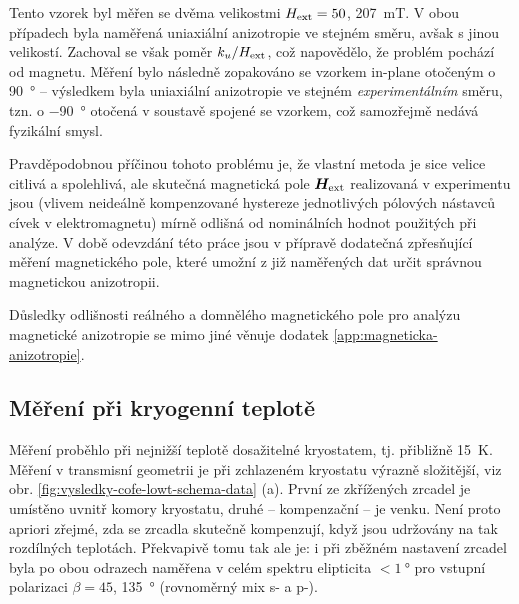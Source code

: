 Tento vzorek byl měřen se dvěma velikostmi $H_\textrm{ext} = 50$, \SI{207}{\milli\tesla}.
V obou případech byla naměřená uniaxiální anizotropie ve stejném směru, avšak s jinou velikostí.
Zachoval se však poměr $k_u/H_\textrm{ext}$, což napovědělo, že problém pochází od magnetu.
Měření bylo následně zopakováno se vzorkem in-plane otočeným o \SI{90}{\degree} -- výsledkem byla uniaxiální anizotropie ve stejném \emph{experimentálním} směru, tzn. o \SI{-90}{\degree} otočená v soustavě spojené se vzorkem, což samozřejmě nedává fyzikální smysl.

Pravděpodobnou příčinou tohoto problému je, že vlastní metoda je sice velice citlivá a spolehlivá, ale skutečná magnetická pole $\bm{H}_\textrm{ext}$ realizovaná v experimentu jsou (vlivem neideálně kompenzované hystereze jednotlivých pólových nástavců cívek v elektromagnetu) mírně odlišná od nominálních hodnot použitých při analýze.
V době odevzdání této práce jsou v přípravě dodatečná zpřesňující měření magnetického pole, které umožní z již naměřených dat určit správnou magnetickou anizotropii.

Důsledky odlišnosti reálného a domnělého magnetického pole pro analýzu magnetické anizotropie se mimo jiné věnuje dodatek \ref{app:magneticka-anizotropie}.

\subsection{Měření při kryogenní teplotě}
\label{chap:vysledky-cofe-lowt}

Měření proběhlo při nejnižší teplotě dosažitelné kryostatem, tj. přibližně \SI{15}{\kelvin}.
Měření v transmisní geometrii je při zchlazeném kryostatu výrazně složitější, viz obr. \ref{fig:vysledky-cofe-lowt-schema-data} (a).
První ze zkřížených zrcadel je umístěno uvnitř komory kryostatu, druhé -- kompenzační -- je venku.
Není proto apriori zřejmé, zda se zrcadla skutečně kompenzují, když jsou udržovány na tak rozdílných teplotách.
Překvapivě tomu tak ale je: i při zběžném nastavení zrcadel byla po obou odrazech naměřena v celém spektru elipticita $<\SI{1}{\degree}$ pro vstupní polarizaci $\beta=45$, \SI{135}{\degree} (rovnoměrný mix s- a p-).

